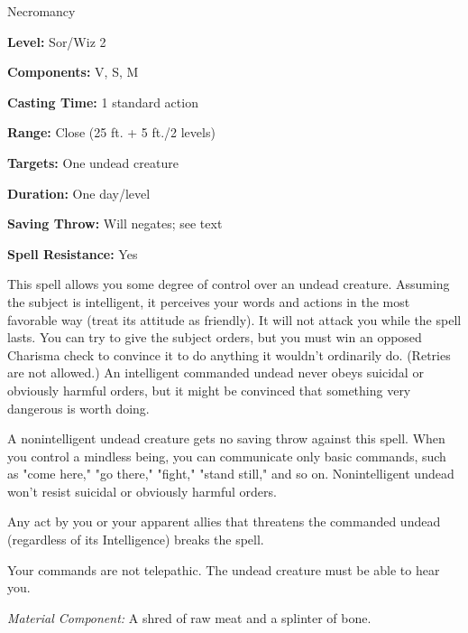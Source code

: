 
Necromancy

\textbf{Level:} Sor/Wiz 2

\textbf{Components:} V, S, M

\textbf{Casting Time:} 1 standard action

\textbf{Range:} Close (25 ft. + 5 ft./2 levels)

\textbf{Targets:} One undead creature

\textbf{Duration:} One day/level

\textbf{Saving Throw:} Will negates; see text

\textbf{Spell Resistance:} Yes

This spell allows you some degree of control over an undead creature. Assuming 
the subject is intelligent, it perceives your words and actions in the most favorable 
way (treat its attitude as friendly). It will not attack you while the spell lasts. 
You can try to give the subject orders, but you must win an opposed Charisma check 
to convince it to do anything it wouldn't ordinarily do. (Retries are not allowed.) 
An intelligent commanded undead never obeys suicidal or obviously harmful orders, 
but it might be convinced that something very dangerous is worth doing.

A nonintelligent undead creature gets no saving throw against this spell. When 
you control a mindless being, you can communicate only basic commands, such as 
"come here," "go there," "fight," "stand still," and so on. Nonintelligent 
undead won't resist suicidal or obviously harmful orders.

Any act by you or your apparent allies that threatens the commanded undead (regardless 
of its Intelligence) breaks the spell.

Your commands are not telepathic. The undead creature must be able to hear you.

\textit{Material Component:} A shred of raw meat and a splinter of bone.

